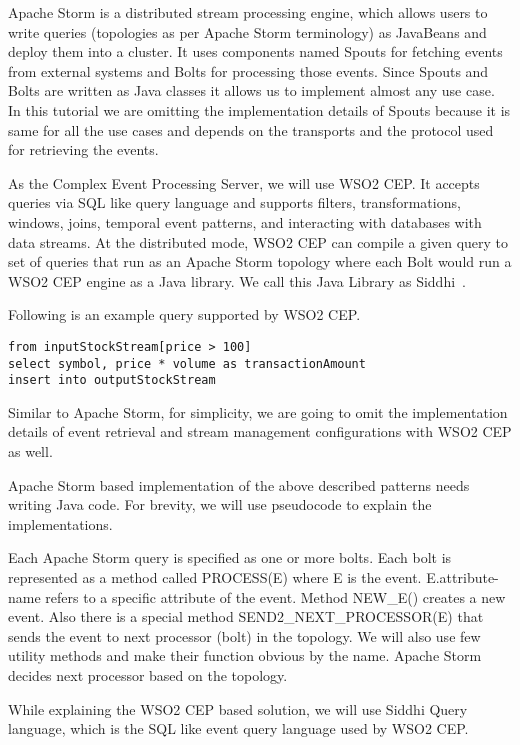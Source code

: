 \documentclass{sig-alternate}
\begin{document}
{Apache Storm is a distributed stream processing engine, which allows users to write queries (topologies as per Apache Storm terminology) as JavaBeans and deploy them into a cluster. It uses components named Spouts for fetching events from external systems and Bolts for processing those events. Since Spouts and Bolts are written as Java classes it allows us to implement almost any use case. In this tutorial we are omitting the implementation details of Spouts because it is same for all the use cases and depends on the transports and the protocol used for retrieving the events. 

As the Complex Event Processing Server, we will use WSO2 CEP. It accepts queries via SQL like query language and supports filters, transformations, windows, joins, temporal event patterns, and interacting with databases with data streams. At the distributed mode, WSO2 CEP can compile a given query to set of queries that run as an Apache Storm topology where each Bolt would run a WSO2 CEP engine as a Java library. We call this Java Library as Siddhi~\cite{siddhilib}.

Following is an example query supported by WSO2 CEP. 

\lstset{language=siddhi}
\begin{lstlisting}[mathescape]
from inputStockStream[price > 100]
select symbol, price * volume as transactionAmount
insert into outputStockStream
\end{lstlisting}


Similar to Apache Storm, for simplicity, we are going to omit the implementation details of event retrieval and stream management configurations with WSO2 CEP as well. 

Apache Storm based implementation of the above described patterns needs writing Java code. For brevity, we will use pseudocode to explain the implementations. 

Each Apache Storm query is specified as one or more bolts. Each bolt is represented as a method called PROCESS(E) where E is the event. E.attribute-name refers to a specific attribute of the event. Method NEW\_E() creates a new event. Also there is a special method SEND2\_NEXT\_PROCESSOR(E) that sends the event to next processor (bolt) in the topology.  We will also use few utility methods and make their function obvious by the name. Apache Storm decides next processor based on the topology. 

While explaining the WSO2 CEP based solution, we will use Siddhi Query language, which is the SQL like event query language used by WSO2 CEP. 


}
\end{document}
